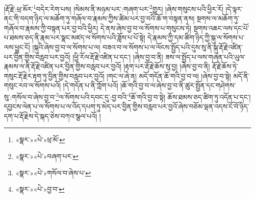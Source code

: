 །རྡོ་རྗེ་:ཕྲ་མོར་\footnote{«སྣར་»«པེ་»ཕྲ་མོ་}བདེར་རེག་པས། །སེམས་ནི་མཉམ་པར་:གཞག་པར་\footnote{«སྣར་»«པེ་»བཞག་པར་}གྱུར། །ཞེས་གསུངས་པའི་ཕྱིར་རོ། །དེ་ལྟར་ནང་གི་བདག་ཉིད་ལ་མཆོག་ཏུ་གཞོལ་བ་རྣམས་ཀྱིས་ཚིམ་པར་བྱ་བའི་ཆོ་ག་བསྟན་ནས། སྔགས་ལ་མཆོག་ཏུ་གཞོལ་བ་རྣམས་ཀྱི་བསྟན་པར་བྱ་བའི་ཕྱིར། དེ་ནས་ཞེས་བྱ་བ་ལ་སོགས་པ་གསུངས་ཏེ། སྔགས་འཆང་ལས་དང་པོ་པ་ཐམས་ཅད་ནི་རྣམ་པར་སྣང་མཛད་ལ་སོགས་པའི་ཟློས་པ་པོ་སྟེ། དེ་རྣམས་ཀྱི་དམ་ཚིག་ཉིད་ཀྱི་སྐུ་ལ་སོགས་པ་ལས་ཕྱུང་ངོ། །སྐུའི་ཞེས་བྱ་བ་ལ་སོགས་པ་ལ། བཟའ་བ་ལ་སོགས་པ་ལ་ལོངས་སྤྱོད་པའི་དུས་སུ་ནི་སྐུ་རྡོ་རྗེ་འཛིན་པར་བྱིན་གྱིས་བརླབ་པར་བྱའོ། །ཕྱི་རོལ་རྡོ་རྗེ་འཛིན་པ་དང་། །ཞེས་བྱ་བ་ནི། ཟས་ལ་སྤྱོད་པ་ལས་གཞན་པའི་ཡུལ་རྣམས་ལ་ནི་རྡོ་རྗེ་འཛིན་པར་བྱིན་གྱིས་བརླབ་པར་བྱའོ། །རྟག་པར་རྡོ་རྗེ་ཆོས་སུ་བྱ། །ཞེས་བྱ་བ་ནི། རྡོ་རྗེ་ཆོས་ཏེ་གསུང་རྡོ་རྗེར་རྟག་ཏུ་བྱིན་གྱིས་བརླབ་པར་བྱའོ། །གང་ལ་ཞེ་ན། མདོ་གདོན་ཆོ་གའི་བྱ་བ་ལ། །ཞེས་བྱ་བ་སྟེ། མདོ་ནི་གསུང་རབ་ལ་སོགས་པའོ། །དེ་གདོན་པ་ནི་ཀློག་པའོ། །ཆོ་གའི་བྱ་བ་ལ་ཞེས་བྱ་བ་ནི་ཚུར་སྤྱོན་དང་གཤེགས་སུ་:གསོལ་བ་ཞེས་བྱ་བ་\footnote{«སྣར་»«པེ་»གསོལ་བ་ཞེས་པ་}ལ་སོགས་པའི་དབང་དུ་:བྱ་བའི་\footnote{«སྣར་»«པེ་»བྱ་བ་}ཆོ་གའི་བྱ་བ་སྟེ། ཆོས་ཐམས་ཅད་ཚིག་ཏུ་འདོན་པ་དང་། དབྱངས་ལེན་པ་ལ་སོགས་པ་ལ་འོད་དཔག་ཏུ་མེད་པར་བྱིན་གྱིས་བརླབ་པར་བྱའོ་ཞེས་བཅོམ་ལྡན་འདས་ངོ་བོ་ཉིད་དག་པ་རྡོ་རྗེས་དེ་སྐད་ཅེས་བཀའ་སྩལ་པའོ། །
